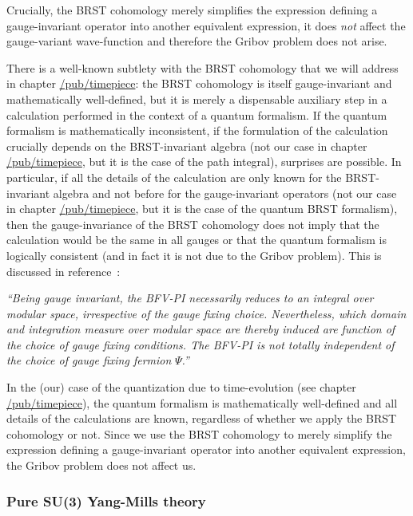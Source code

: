 \documentclass[11pt]{book}
\begin{document}
Crucially, the BRST cohomology merely simplifies the expression defining
a gauge-invariant operator into another equivalent expression, it does
\emph{not} affect the gauge-variant wave-function and therefore the
Gribov problem does not arise.

There is a well-known subtlety with the BRST cohomology that we will
address in chapter
\href{https://timepiece.pubpub.org/pub/timepiece}{/pub/timepiece}: the
BRST cohomology is itself gauge-invariant and mathematically
well-defined, but it is merely a dispensable auxiliary step in a
calculation performed in the context of a quantum formalism. If the
quantum formalism is mathematically inconsistent, if the formulation of
the calculation crucially depends on the BRST-invariant algebra (not our
case in chapter
\href{https://timepiece.pubpub.org/pub/timepiece}{/pub/timepiece}, but
it is the case of the path integral), surprises are possible. In
particular, if all the details of the calculation are only known for the
BRST-invariant algebra and not before for the gauge-invariant operators
(not our case in chapter
\href{https://timepiece.pubpub.org/pub/timepiece}{/pub/timepiece}, but
it is the case of the quantum BRST formalism), then the gauge-invariance
of the BRST cohomology does not imply that the calculation would be the
same in all gauges or that the quantum formalism is logically consistent
(and in fact it is not due to the Gribov problem). This is discussed in
reference~\cite{Govaerts2004Revisiting}:

\emph{``Being gauge invariant, the BFV-PI necessarily reduces to an
integral over modular space, irrespective of the gauge fixing choice.
Nevertheless, which domain and integration measure over modular space
are thereby induced are function of the choice of gauge fixing
conditions. The BFV-PI is not totally independent of the choice of gauge
fixing fermion }\(\Psi\)\emph{.''}

In the (our) case of the quantization due to time-evolution (see chapter
\href{https://timepiece.pubpub.org/pub/timepiece}{/pub/timepiece}), the
quantum formalism is mathematically well-defined and all details of the
calculations are known, regardless of whether we apply the BRST
cohomology or not. Since we use the BRST cohomology to merely simplify
the expression defining a gauge-invariant operator into another
equivalent expression, the Gribov problem does not affect us.

\hypertarget{pure-su3-yang-mills-theory}{%
\subsubsection{Pure SU(3) Yang-Mills
theory}\label{pure-su3-yang-mills-theory}}
\end{document}
